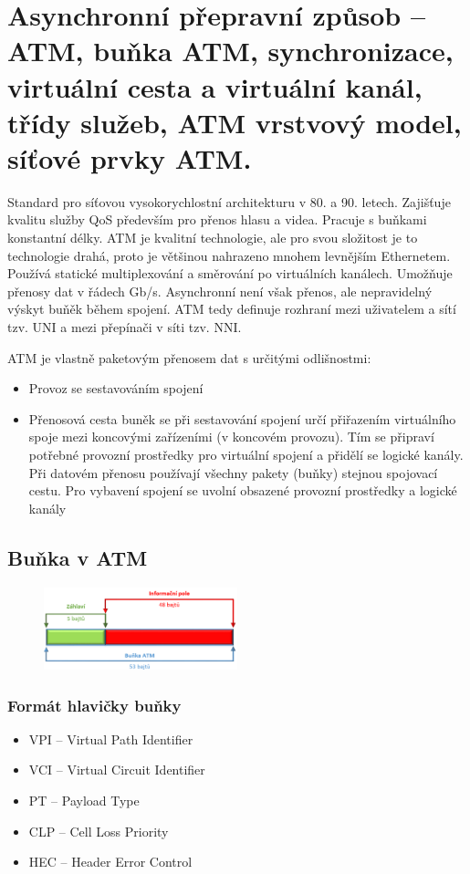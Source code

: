 \clearpage
\section{Asynchronní přepravní způsob -- ATM, buňka ATM, synchronizace, virtuální cesta a virtuální kanál, třídy služeb, ATM vrstvový model, síťové prvky ATM.}

Standard pro síťovou vysokorychlostní architekturu v 80. a 90. letech. Zajišťuje kvalitu služby QoS především pro přenos hlasu a videa. Pracuje s buňkami konstantní délky. ATM je kvalitní technologie, ale pro svou složitost je to technologie drahá, proto je většinou nahrazeno mnohem levnějším Ethernetem. Používá statické multiplexování a směrování po virtuálních kanálech. Umožňuje přenosy dat v řádech Gb/s. Asynchronní není však přenos, ale nepravidelný výskyt buňěk během spojení. ATM tedy definuje rozhraní mezi uživatelem a sítí tzv. UNI a mezi přepínači v síti tzv. NNI.

ATM je vlastně paketovým přenosem dat s určitými odlišnostmi:
\begin{itemize}
    \item Provoz se sestavováním spojení
    \item Přenosová cesta buněk se při sestavování spojení určí přiřazením virtuálního spoje mezi koncovými zařízeními (v koncovém provozu). Tím se připraví potřebné provozní prostředky pro virtuální spojení a přidělí se logické kanály. Při datovém přenosu používají všechny pakety (buňky) stejnou spojovací cestu. Pro vybavení spojení se uvolní obsazené provozní prostředky a logické kanály
\end{itemize}

\subsection{Buňka v ATM}
\begin{figure} [h]
    \centering
    \includegraphics[width=0.5\textwidth]{snimky/ATM bunka.png}
    \label{fig:atm-bunka}
\end{figure}

\subsubsection{Formát hlavičky buňky}
\begin{itemize}
    \item VPI -- Virtual Path Identifier
    \item VCI -- Virtual Circuit Identifier
    \item PT -- Payload Type
    \item CLP -- Cell Loss Priority
    \item HEC -- Header Error Control
\end{itemize}

